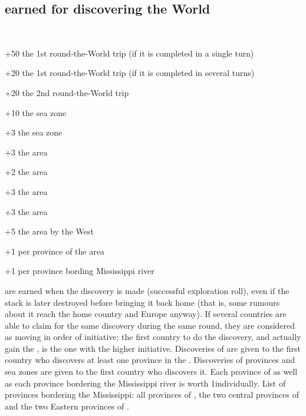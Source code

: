 \subsection{\VPs earned for discovering the World}
\aparag[Discoveries]~\\
\begin{modlist}
\item[+50] the 1st round-the-World trip (if it is completed in a
  single turn)
\item[+20] the 1st round-the-World trip (if it is completed in several
  turns)
\item[+20] the 2nd round-the-World trip
\item[+10] the \seazoneHorn sea zone
\item[+3] the \seazoneHudson sea zone
\item[+3] the \granderegionQuebec area
\item[+2] the  area
\item[+3] the \granderegionRocheuses area
\item[+3] the \granderegionAlaska area
\item[+5] the \granderegionPanama area by the West
\item[+1] per province of the \granderegionAmazonia area
\item[+1] per province bording Mississippi river
\end{modlist}

\aparag[Discoveries] \VPs are earned when the discovery is made
(successful exploration roll), even if the stack is later destroyed
before bringing it back home (that is, some rumours about it reach the
home country and Europe anyway).
\bparag If several countries are able to claim \VPs for the same
discovery during the same round, they are considered as moving in order
of initiative: the first country to do the discovery, and actually gain
the \VPs, is the one with the higher initiative.
\bparag Discoveries \VPs of \Areas are given to the first country who
discovers at least one province in the \Area.
\bparag Discoveries \VPs of provinces and sea zones are given to the first
country who discovers it. Each province of \granderegionAmazonia as well as
each province bordering the Mississippi river is worth 1\VP individually.
\bparag List of provinces bordering the Mississippi: all provinces of
\granderegionMississippi, the two central provinces of \granderegionIllinois
and the two Eastern provinces of \granderegionKansas.

